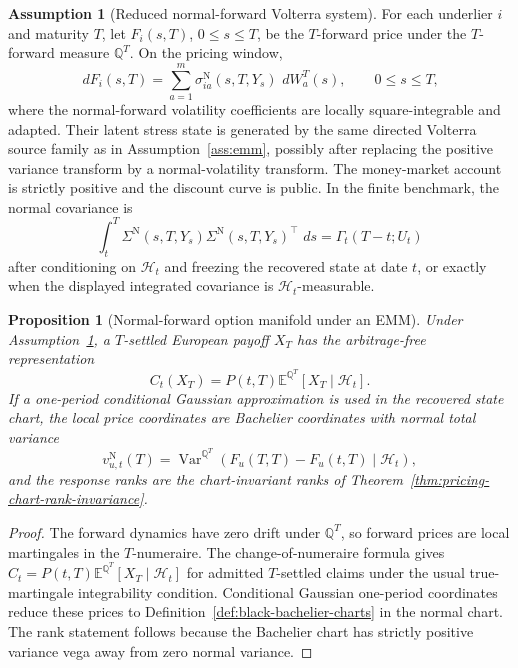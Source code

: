 \documentclass[11pt,a4paper]{amsart}
\theoremstyle{plain}
\newtheorem{proposition}[theorem]{Proposition}
\theoremstyle{definition}
\newtheorem{assumption}[theorem]{Assumption}
\theoremstyle{remark}
\DeclareMathOperator{\Var}{Var}
\newcommand{\QQ}{\mathbb{Q}}
\newcommand{\EE}{\mathbb{E}}
\newcommand{\cH}{\mathcal{H}}
\newcommand{\dd}{\,d}
\begin{document}
\begin{assumption}[Reduced normal-forward Volterra system]\label{ass:normal-forward-emm}
For each underlier \(i\) and maturity \(T\), let \(F_i(s,T)\), \(0\le s\le T\), be the
\(T\)-forward price under the \(T\)-forward measure \(\QQ^T\).  On the pricing window,
\[
        \dd F_i(s,T)
        =
        \sum_{a=1}^m \sigma_{ia}^{\mathrm N}(s,T,Y_s)\,\dd W_a^{T}(s),
        \qquad 0\le s\le T,
\]
where the normal-forward volatility coefficients are locally square-integrable and adapted.
Their latent stress state is generated by the same directed Volterra source family as in
Assumption~\ref{ass:emm}, possibly after replacing the positive variance transform by a
normal-volatility transform.  The money-market account is strictly positive and the discount
curve is public.  In the finite benchmark, the normal covariance is
\[
        \int_t^T
        \Sigma^{\mathrm N}(s,T,Y_s)
        \Sigma^{\mathrm N}(s,T,Y_s)^\top\,\dd s
        =
        \Gamma_t(T-t;U_t)
\]
after conditioning on \(\cH_t\) and freezing the recovered state at date \(t\), or exactly when
the displayed integrated covariance is \(\cH_t\)-measurable.
\end{assumption}

\begin{proposition}[Normal-forward option manifold under an EMM]\label{prop:normal-forward-emm}
Under Assumption~\ref{ass:normal-forward-emm}, a \(T\)-settled European payoff \(X_T\) has the
arbitrage-free representation
\[
        C_t(X_T)
        =
        P(t,T)\EE^{\QQ^T}\!\left[X_T\mid\cH_t\right].
\]
If a one-period conditional Gaussian approximation is used in the recovered state chart, the
local price coordinates are Bachelier coordinates with normal total variance
\[
        v_{u,t}^{\mathrm N}(T)
        =
        \Var^{\QQ^T}(F_u(T,T)-F_u(t,T)\mid\cH_t),
\]
and the response ranks are the chart-invariant ranks of
Theorem~\ref{thm:pricing-chart-rank-invariance}.
\end{proposition}

\begin{proof}
The forward dynamics have zero drift under \(\QQ^T\), so forward prices are local martingales in
the \(T\)-numeraire.  The change-of-numeraire formula gives
\(C_t=P(t,T)\EE^{\QQ^T}[X_T\mid\cH_t]\) for admitted \(T\)-settled claims under the usual
true-martingale integrability condition.  Conditional Gaussian one-period coordinates reduce
these prices to Definition~\ref{def:black-bachelier-charts} in the normal chart.  The rank
statement follows because the Bachelier chart has strictly positive variance vega away from zero
normal variance.
\end{proof}
\end{document}
